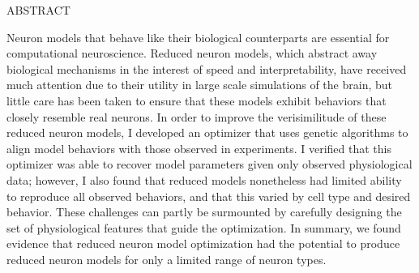 
\begin{center}
    ABSTRACT
\end{center}
\hspace*{\parindent} 
Neuron models that behave like their biological counterparts are essential for computational neuroscience.
Reduced neuron models, which abstract away biological mechanisms in the interest of speed and interpretability, have received much attention due to their utility in large scale simulations of the brain, but little care has been taken to ensure that these models exhibit behaviors that closely resemble real neurons.
In order to improve the verisimilitude of these reduced neuron models, I developed an optimizer that uses genetic algorithms to align model behaviors with those observed in experiments.
I verified that this optimizer was able to recover model parameters given only observed physiological data; however, I also found that reduced models nonetheless had limited ability to reproduce all observed behaviors, and that this varied by cell type and desired behavior.
These challenges can partly be surmounted by carefully designing the set of physiological features that guide the optimization. In summary, we found evidence that reduced neuron model optimization had the potential to produce reduced neuron models for only a limited range of neuron types.










